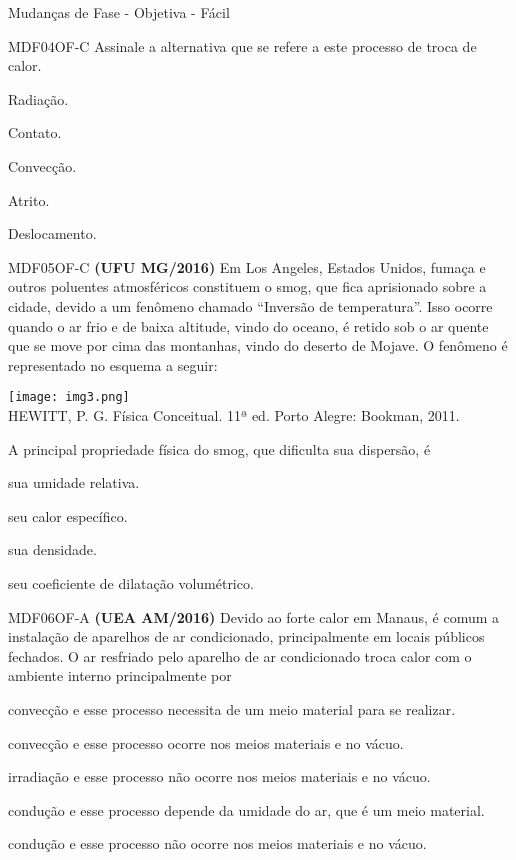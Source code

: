 \documentclass[12pt]{article}
\begin{document}
\begin{quiz}{Mudanças de Fase - Objetiva - Fácil}
\begin{multi}[points=1,penalty=0]{MDF04OF-C}
			Assinale a alternativa que se refere a este processo de troca de calor.										
			\item Radiação.
			\item Contato.
			\item* Convecção.
			\item Atrito.
			\item Deslocamento.
		\end{multi}
		\begin{multi}[points=1,penalty=0]{MDF05OF-C}
			\textbf{(UFU MG/2016)} Em Los Angeles, Estados Unidos, fumaça e outros poluentes atmosféricos constituem o smog, que fica aprisionado sobre a cidade, devido a um fenômeno chamado “Inversão de temperatura”. Isso ocorre quando o ar frio e de baixa altitude, vindo do oceano, é retido sob o ar quente que se move por cima das montanhas, vindo do deserto de Mojave. O fenômeno é representado no esquema a seguir:
			\begin{center}
				\texttt{[image: img3.png]}\\HEWITT, P. G. Física Conceitual. 11ª ed. Porto Alegre: Bookman, 2011.			
			\end{center}
			A principal propriedade física do smog, que dificulta sua dispersão, é			
			\item sua umidade relativa.
			\item seu calor específico.
			\item* sua densidade.
			\item seu coeficiente de dilatação volumétrico.	
		\end{multi}	
		\begin{multi}[points=1,penalty=0]{MDF06OF-A}
			\textbf{(UEA AM/2016)} Devido ao forte calor em Manaus, é comum a instalação de aparelhos de ar condicionado, principalmente em locais públicos fechados. O ar resfriado pelo aparelho de ar condicionado troca calor com o ambiente interno principalmente por	
			\item* convecção e esse processo necessita de um meio material para se realizar.
			\item convecção e esse processo ocorre nos meios materiais e no vácuo.
			\item irradiação e esse processo não ocorre nos meios materiais e no vácuo.
			\item condução e esse processo depende da umidade do ar, que é um meio material.	
			\item condução e esse processo não ocorre nos meios materiais e no vácuo.
		\end{multi}

\end{quiz}
\end{document}
